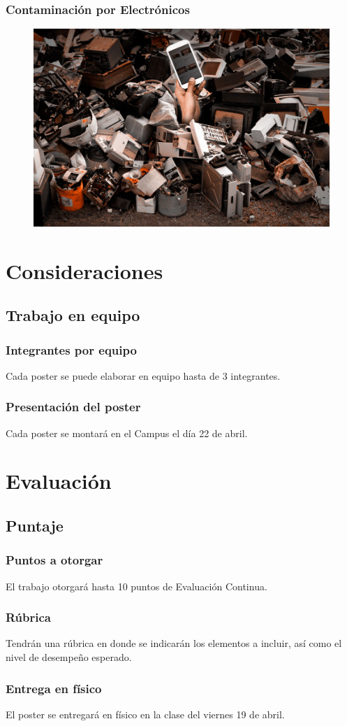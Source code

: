 \documentclass[14pt]{beamer}
\begin{document}
\begin{frame}
\frametitle{Contaminación por Electrónicos}
\vspace*{-1cm}
\begin{figure}
    \centering
    \includegraphics[scale=0.25]{Imagenes/Contaminacion_05.jpg}
\end{figure}
\end{frame}

\section{Consideraciones}
\subsection{Trabajo en equipo}

\begin{frame}
\frametitle{Integrantes por equipo}
Cada poster se puede elaborar en equipo hasta de 3 integrantes.
\end{frame}
\begin{frame}
\frametitle{Presentación del poster}
Cada poster se montará en el Campus el día 22 de abril.
\end{frame}

\section{Evaluación}
\subsection{Puntaje}

\begin{frame}
\frametitle{Puntos a otorgar}
El trabajo otorgará hasta \num{10} puntos de Evaluación Continua.
\end{frame}
\begin{frame}
\frametitle{Rúbrica}
Tendrán una rúbrica en donde se indicarán los elementos a incluir, así como el nivel de desempeño esperado.
\end{frame}
\begin{frame}
\frametitle{Entrega en físico}
El poster se entregará en físico en la clase del viernes 19 de abril.
\end{frame}
\end{document}
